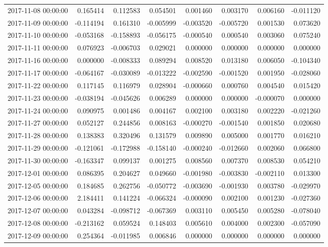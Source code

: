 \begin{tabular}{lrrrrrrr}
2017-11-08 00:00:00 & 0.165414 & 0.112583 & 0.054501 & 0.001460 & 0.003170 & 0.006160 & -0.011120 \\
2017-11-09 00:00:00 & -0.114194 & 0.161310 & -0.005999 & -0.003520 & -0.005720 & 0.001530 & 0.073620 \\
2017-11-10 00:00:00 & -0.053168 & -0.158893 & -0.056175 & -0.000540 & 0.000540 & 0.003060 & 0.075240 \\
2017-11-11 00:00:00 & 0.076923 & -0.006703 & 0.029021 & 0.000000 & 0.000000 & 0.000000 & 0.000000 \\
2017-11-16 00:00:00 & 0.000000 & -0.008333 & 0.089294 & 0.008520 & 0.013180 & 0.006050 & -0.104340 \\
2017-11-17 00:00:00 & -0.064167 & -0.030089 & -0.013222 & -0.002590 & -0.001520 & 0.001950 & -0.028060 \\
2017-11-22 00:00:00 & 0.117145 & 0.116979 & 0.028904 & -0.000660 & 0.000760 & 0.004540 & 0.015420 \\
2017-11-23 00:00:00 & -0.038194 & -0.045626 & 0.006289 & 0.000000 & 0.000000 & -0.000070 & 0.000000 \\
2017-11-24 00:00:00 & 0.090975 & 0.001486 & 0.004167 & 0.002100 & 0.003180 & 0.002220 & -0.021260 \\
2017-11-27 00:00:00 & 0.052127 & 0.244856 & 0.008163 & -0.000270 & -0.001540 & 0.001850 & 0.020680 \\
2017-11-28 00:00:00 & 0.138383 & 0.320496 & 0.131579 & 0.009890 & 0.005000 & 0.001770 & 0.016210 \\
2017-11-29 00:00:00 & -0.121061 & -0.172988 & -0.158140 & -0.000240 & -0.012660 & 0.002060 & 0.066800 \\
2017-11-30 00:00:00 & -0.163347 & 0.099137 & 0.001275 & 0.008560 & 0.007370 & 0.008530 & 0.054210 \\
2017-12-01 00:00:00 & 0.086395 & 0.204627 & 0.049660 & -0.001980 & -0.003830 & -0.002110 & 0.013300 \\
2017-12-05 00:00:00 & 0.184685 & 0.262756 & -0.050772 & -0.003690 & -0.001930 & 0.003780 & -0.029970 \\
2017-12-06 00:00:00 & 2.184411 & 0.141224 & -0.066324 & -0.000090 & 0.002100 & 0.001230 & -0.027360 \\
2017-12-07 00:00:00 & 0.043284 & -0.098712 & -0.067369 & 0.003110 & 0.005450 & 0.005280 & -0.078040 \\
2017-12-08 00:00:00 & -0.213162 & 0.059524 & 0.148403 & 0.005610 & 0.004000 & 0.002300 & -0.057090 \\
2017-12-09 00:00:00 & 0.254364 & -0.011985 & 0.006846 & 0.000000 & 0.000000 & 0.000000 & 0.000000 \\

\end{tabular}
